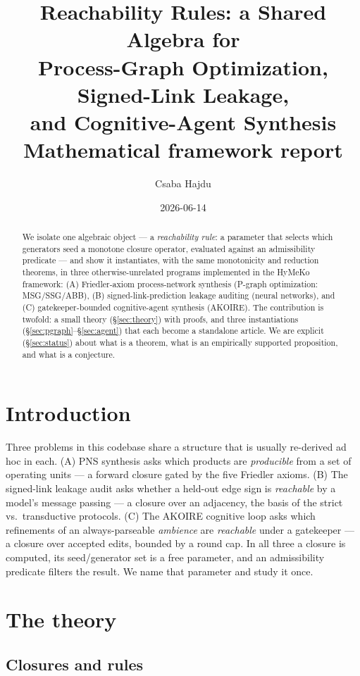 \documentclass[11pt,a4paper]{article}
\title{Reachability Rules: a Shared Algebra for\\
       Process-Graph Optimization, Signed-Link Leakage,\\
       and Cognitive-Agent Synthesis\\[0.3em]
       \large Mathematical framework report}
\author{Csaba Hajdu}
\date{2026-06-14}
\theoremstyle{definition}
\theoremstyle{plain}
\theoremstyle{remark}
\begin{document}
\maketitle

\begin{abstract}
We isolate one algebraic object --- a \emph{reachability rule}: a parameter that
selects which generators seed a monotone closure operator, evaluated against an
admissibility predicate --- and show it instantiates, with the same monotonicity
and reduction theorems, in three otherwise-unrelated programs implemented in the
HyMeKo framework: (A) Friedler-axiom process-network synthesis (P-graph
optimization: MSG/SSG/ABB), (B) signed-link-prediction leakage auditing (neural
networks), and (C) gatekeeper-bounded cognitive-agent synthesis (AKOIRE). The
contribution is twofold: a small theory (\S\ref{sec:theory}) with proofs, and
three instantiations (\S\ref{sec:pgraph}--\S\ref{sec:agent}) that each become a
standalone article. We are explicit (\S\ref{sec:status}) about what is a theorem,
what is an empirically supported proposition, and what is a conjecture.
\end{abstract}

\section{Introduction}

Three problems in this codebase share a structure that is usually re-derived ad
hoc in each. (A) PNS synthesis asks which products are \emph{producible} from a
set of operating units --- a forward closure gated by the five Friedler axioms.
(B) The signed-link leakage audit asks whether a held-out edge sign is
\emph{reachable} by a model's message passing --- a closure over an adjacency,
the basis of the strict vs.\ transductive protocols. (C) The AKOIRE cognitive
loop asks which refinements of an always-parseable \emph{ambience} are
\emph{reachable} under a gatekeeper --- a closure over accepted edits, bounded by
a round cap. In all three a closure is computed, its seed/generator set is a free
parameter, and an admissibility predicate filters the result. We name that
parameter and study it once.

\section{The theory}
\label{sec:theory}

\subsection{Closures and rules}
\end{document}
